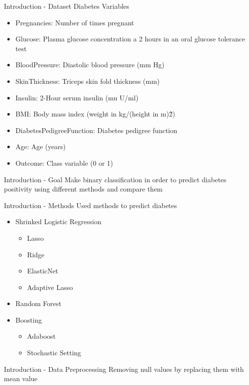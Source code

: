 \begin{frame}{Introduction - Dataset Diabetes}
    Variables
    \begin{itemize}
        \item Pregnancies: Number of times pregnant
        \item Glucose: Plasma glucose concentration a 2 hours in an oral glucose tolerance test
        \item BloodPressure: Diastolic blood pressure (mm Hg)
        \item SkinThickness: Triceps skin fold thickness (mm)
        \item Insulin: 2-Hour serum insulin (mu U/ml)
        \item BMI: Body mass index (weight in kg/(height in m)\^2)
        \item DiabetesPedigreeFunction: Diabetes pedigree function
        \item Age: Age (years)
        \item Outcome: Class variable (0 or 1)
    \end{itemize}
\end{frame}

\begin{frame}{Introduction - Goal}
    Make binary classification in order to predict diabetes positivity using different methods and compare them     
\end{frame}

\begin{frame}{Introduction - Methods}
    Used methods to predict diabetes
    \begin{itemize}
        \item Shrinked Logistic Regression
        \begin{itemize}
            \item Lasso
            \item Ridge
            \item ElasticNet
            \item Adaptive Lasso
        \end{itemize}
        \item Random Forest
        \item Boosting
        \begin{itemize}
            \item Adaboost
            \item Stochastic Setting 
        \end{itemize}
    \end{itemize}
\end{frame}

\begin{frame}{Introduction - Data Preprocessing}
    Removing null values by replacing them with mean value
\end{frame}